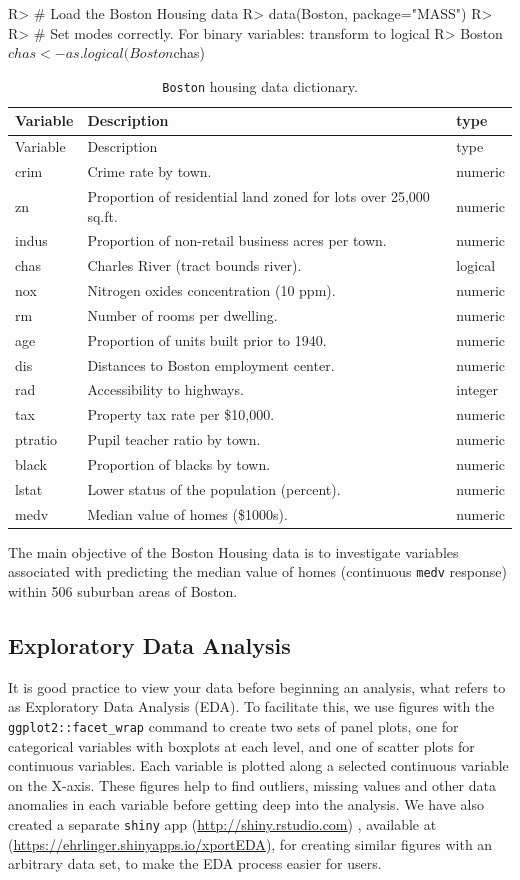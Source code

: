 \documentclass[article]{jss}
\begin{document}
\begin{CodeChunk}

\begin{CodeInput}
R> # Load the Boston Housing data
R> data(Boston, package="MASS")
R> 
R> # Set modes correctly. For binary variables: transform to logical
R> Boston$chas <- as.logical(Boston$chas)
\end{CodeInput}
\end{CodeChunk}

\begin{longtable}[]{@{}lll@{}}
\caption{\texttt{Boston} housing data dictionary.}\tabularnewline
\toprule
Variable & Description & type\tabularnewline
\midrule
\endfirsthead
\toprule
Variable & Description & type\tabularnewline
\midrule
\endhead
crim & Crime rate by town. & numeric\tabularnewline
zn & Proportion of residential land zoned for lots over 25,000 sq.ft. &
numeric\tabularnewline
indus & Proportion of non-retail business acres per town. &
numeric\tabularnewline
chas & Charles River (tract bounds river). & logical\tabularnewline
nox & Nitrogen oxides concentration (10 ppm). & numeric\tabularnewline
rm & Number of rooms per dwelling. & numeric\tabularnewline
age & Proportion of units built prior to 1940. & numeric\tabularnewline
dis & Distances to Boston employment center. & numeric\tabularnewline
rad & Accessibility to highways. & integer\tabularnewline
tax & Property tax rate per \$10,000. & numeric\tabularnewline
ptratio & Pupil teacher ratio by town. & numeric\tabularnewline
black & Proportion of blacks by town. & numeric\tabularnewline
lstat & Lower status of the population (percent). &
numeric\tabularnewline
medv & Median value of homes (\$1000s). & numeric\tabularnewline
\bottomrule
\end{longtable}

The main objective of the Boston Housing data is to investigate
variables associated with predicting the median value of homes
(continuous \texttt{medv} response) within 506 suburban areas of Boston.

\hypertarget{exploratory-data-analysis}{%
\subsection{Exploratory Data Analysis}\label{exploratory-data-analysis}}

It is good practice to view your data before beginning an analysis,
what\citep{Tukey:1977} refers to as Exploratory Data Analysis (EDA). To
facilitate this, we use  figures with the
\texttt{ggplot2::facet\_wrap} command to create two sets of panel plots,
one for categorical variables with boxplots at each level, and one of
scatter plots for continuous variables. Each variable is plotted along a
selected continuous variable on the X-axis. These figures help to find
outliers, missing values and other data anomalies in each variable
before getting deep into the analysis. We have also created a separate
\texttt{shiny} app (\url{http://shiny.rstudio.com}) \citep{shiny:2015},
available at (\url{https://ehrlinger.shinyapps.io/xportEDA}), for
creating similar figures with an arbitrary data set, to make the EDA
process easier for users.
\end{document}
